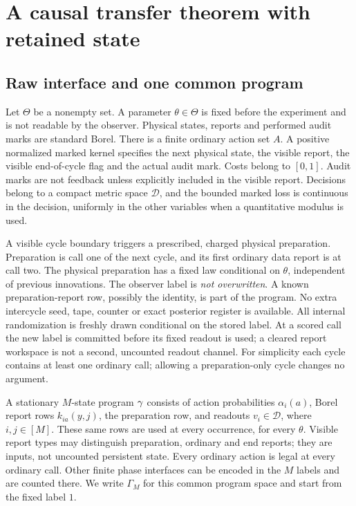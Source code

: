 \section{A causal transfer theorem with retained state}\label{sec:theorem}
\subsection{Raw interface and one common program}
Let $\Theta$ be a nonempty set. A parameter $\theta\in\Theta$ is fixed before the experiment and is not readable by the observer. Physical states, reports and performed audit marks are standard Borel. There is a finite ordinary action set $A$. A positive normalized marked kernel specifies the next physical state, the visible report, the visible end-of-cycle flag and the actual audit mark. Costs belong to $[0,1]$. Audit marks are not feedback unless explicitly included in the visible report. Decisions belong to a compact metric space $\mathcal D$, and the bounded marked loss is continuous in the decision, uniformly in the other variables when a quantitative modulus is used.

A visible cycle boundary triggers a prescribed, charged physical preparation. Preparation is call one of the next cycle, and its first ordinary data report is at call two. The physical preparation has a fixed law conditional on $\theta$, independent of previous innovations. The observer label is \emph{not overwritten}. A known preparation-report row, possibly the identity, is part of the program. No extra intercycle seed, tape, counter or exact posterior register is available. All internal randomization is freshly drawn conditional on the stored label. At a scored call the new label is committed before its fixed readout is used; a cleared report workspace is not a second, uncounted readout channel. For simplicity each cycle contains at least one ordinary call; allowing a preparation-only cycle changes no argument.

A stationary $M$-state program $\gamma$ consists of action probabilities $\alpha_i(a)$, Borel report rows $k_{ia}(y,j)$, the preparation row, and readouts $v_i\in\mathcal D$, where $i,j\in[M]$. These same rows are used at every occurrence, for every $\theta$. Visible report types may distinguish preparation, ordinary and end reports; they are inputs, not uncounted persistent state. Every ordinary action is legal at every ordinary call. Other finite phase interfaces can be encoded in the $M$ labels and are counted there. We write $\Gamma_M$ for this common program space and start from the fixed label $1$.

